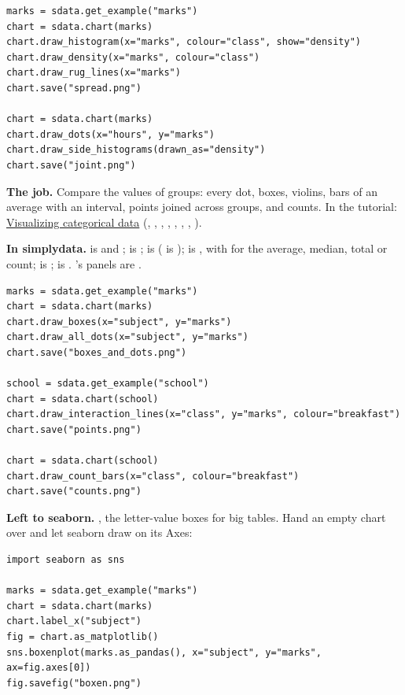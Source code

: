 \begin{lstlisting}[style=py]
marks = sdata.get_example("marks")
chart = sdata.chart(marks)
chart.draw_histogram(x="marks", colour="class", show="density")
chart.draw_density(x="marks", colour="class")
chart.draw_rug_lines(x="marks")
chart.save("spread.png")

chart = sdata.chart(marks)
chart.draw_dots(x="hours", y="marks")
chart.draw_side_histograms(drawn_as="density")
chart.save("joint.png")
\end{lstlisting}


\textbf{The job.} Compare the values of groups: every dot, boxes, violins, bars of an average with
an interval, points joined across groups, and counts. In the tutorial:
\href{https://seaborn.pydata.org/tutorial/categorical.html}{Visualizing categorical data}
(, , , , ,
, , ).

\textbf{In simplydata.}  is  and ;
 is ;  is  (
is );  is , with  for the average,
median, total or count;  is ; 
is . 's panels are .

\begin{lstlisting}[style=py]
marks = sdata.get_example("marks")
chart = sdata.chart(marks)
chart.draw_boxes(x="subject", y="marks")
chart.draw_all_dots(x="subject", y="marks")
chart.save("boxes_and_dots.png")

school = sdata.get_example("school")
chart = sdata.chart(school)
chart.draw_interaction_lines(x="class", y="marks", colour="breakfast")
chart.save("points.png")

chart = sdata.chart(school)
chart.draw_count_bars(x="class", colour="breakfast")
chart.save("counts.png")
\end{lstlisting}

\textbf{Left to seaborn.} , the letter-value boxes for big tables. Hand an empty chart
over and let seaborn draw on its Axes:

\begin{lstlisting}[style=py]
import seaborn as sns

marks = sdata.get_example("marks")
chart = sdata.chart(marks)
chart.label_x("subject")
fig = chart.as_matplotlib()
sns.boxenplot(marks.as_pandas(), x="subject", y="marks", ax=fig.axes[0])
fig.savefig("boxen.png")
\end{lstlisting}

